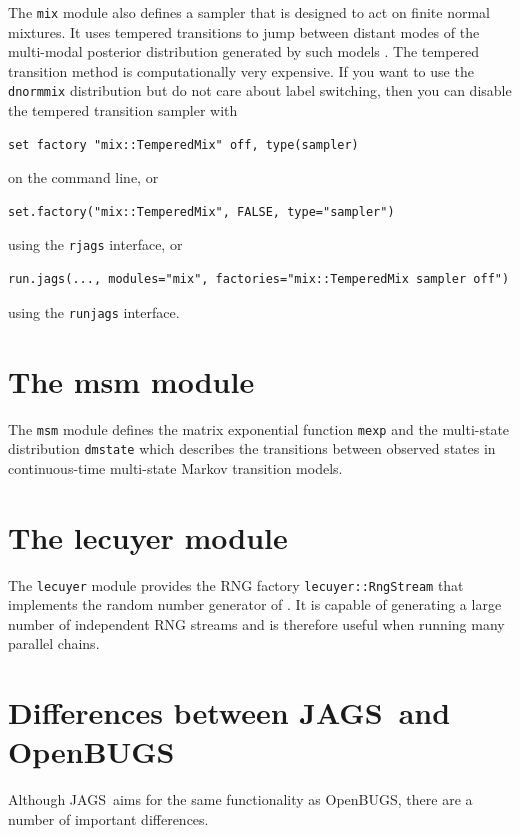 \documentclass[11pt, a4paper, titlepage]{report}
\newcommand{\JAGS}{\textsf{JAGS}}
\newcommand{\OpenBUGS}{\textsf{OpenBUGS}}
\begin{document}
{The \texttt{mix} module also defines a sampler that is designed to act
on finite normal mixtures. It uses tempered transitions to jump
between distant modes of the multi-modal posterior distribution
generated by such models \citep{Neal94,Celeux99}. The tempered
transition method is computationally very expensive. If you want to
use the \texttt{dnormmix} distribution but do not care about label
switching, then you can disable the tempered transition sampler with
\begin{verbatim}
set factory "mix::TemperedMix" off, type(sampler)
\end{verbatim}
on the command line, or
\begin{verbatim}
set.factory("mix::TemperedMix", FALSE, type="sampler")
\end{verbatim}
using the \texttt{rjags} interface, or
\begin{verbatim}
run.jags(..., modules="mix", factories="mix::TemperedMix sampler off")
\end{verbatim}
using the \texttt{runjags} interface.

\chapter{The msm module}

The \texttt{msm} module defines the matrix exponential function
\texttt{mexp} and the multi-state distribution \texttt{dmstate} which
describes the transitions between observed states in continuous-time
multi-state Markov transition models. 

\chapter{The lecuyer module}

The \texttt{lecuyer} module provides the RNG factory
\texttt{lecuyer::RngStream} that implements the random number generator of
\citet{lecuyer02}.  It is capable of generating a large number of
independent RNG streams and is therefore useful when running many
parallel chains.

\appendix

\chapter{Differences between \JAGS\ and \OpenBUGS}

Although \JAGS\ aims for the same functionality as \OpenBUGS, there are
a number of important differences.

}
\end{document}
